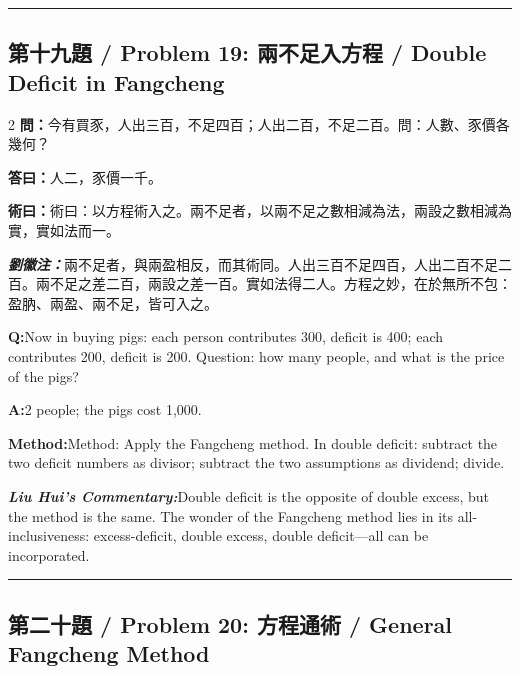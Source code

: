 \documentclass[11pt,a4paper]{article}
\newcommand{\cnwen}{\textcolor{cnlabelfg}{\textbf{問：}}}
\newcommand{\cnda}{\textbf{答曰：}}
\newcommand{\cnshu}{\textcolor{cnlabelfg}{\textbf{術曰：}}}
\newcommand{\cnzhu}{\textcolor{commentarycolor}{\textit{\textbf{劉徽注：}}}}
\newcommand{\enwen}{\textcolor{enlabelfg}{\textbf{Q:}}}
\newcommand{\enda}{\textcolor{enlabelfg}{\textbf{A:}}}
\newcommand{\enshu}{\textcolor{enlabelfg}{\textbf{Method:}}}
\newcommand{\enzhu}{\textcolor{enlabelfg}{\textit{\textbf{Liu Hui's Commentary:}}}}
\begin{document}
\bigskip\hrule\bigskip

\subsection{第十九題 / Problem 19: 兩不足入方程 / Double Deficit in Fangcheng}

\begin{paracol}{2}
\switchcolumn[0]
\cnwen 今有買豕，人出三百，不足四百；人出二百，不足二百。問：人數、豕價各幾何？

\cnda 人二，豕價一千。

\cnshu 術曰：以方程術入之。兩不足者，以兩不足之數相減為法，兩設之數相減為實，實如法而一。

\cnzhu 兩不足者，與兩盈相反，而其術同。人出三百不足四百，人出二百不足二百。兩不足之差二百，兩設之差一百。實如法得二人。方程之妙，在於無所不包：盈肭、兩盈、兩不足，皆可入之。

\switchcolumn[1]
\enwen Now in buying pigs: each person contributes 300, deficit is 400; each contributes 200, deficit is 200. Question: how many people, and what is the price of the pigs?

\enda 2 people; the pigs cost 1,000.

\enshu Method: Apply the Fangcheng method. In double deficit: subtract the two deficit numbers as divisor; subtract the two assumptions as dividend; divide.

\enzhu Double deficit is the opposite of double excess, but the method is the same. The wonder of the Fangcheng method lies in its all-inclusiveness: excess-deficit, double excess, double deficit---all can be incorporated.
\end{paracol}

\bigskip\hrule\bigskip

\subsection{第二十題 / Problem 20: 方程通術 / General Fangcheng Method}
\end{document}
